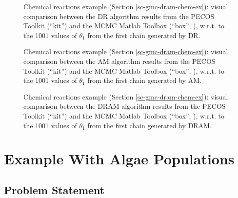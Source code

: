\begin{figure}[h!]
\begin{center}
\end{center}
\caption{Chemical reactions example (Section \ref{sc-gmc-dram-chem-ex}):
visual comparison between the DR algorithm results from the PECOS Toolkit (``kit'') and the MCMC Matlab Toolbox (``box'', \cite{mcmctool}), w.r.t. to the 1001 values of $\theta_1$ from the first chain generated by DR.
}
\label{fig-dram-chem-ex-comparison-DR-theta1-chain1}
\end{figure}

\begin{figure}[h!]
\begin{center}
\end{center}
\caption{Chemical reactions example (Section \ref{sc-gmc-dram-chem-ex}):
visual comparison between the AM algorithm results from the PECOS Toolkit (``kit'') and the MCMC Matlab Toolbox (``box'', \cite{mcmctool}), w.r.t. to the 1001 values of $\theta_1$ from the first chain generated by AM.
}
\label{fig-dram-chem-ex-comparison-AM-theta1-chain1}
\end{figure}

\begin{figure}[h!]
\begin{center}
\end{center}
\caption{Chemical reactions example (Section \ref{sc-gmc-dram-chem-ex}):
visual comparison between the DRAM algorithm results from the PECOS Toolkit (``kit'') and the MCMC Matlab Toolbox (``box'', \cite{mcmctool}), w.r.t. to the 1001 values of $\theta_1$ from the first chain generated by DRAM.
}
\label{fig-dram-chem-ex-comparison-DRAM-theta1-chain1}
\end{figure}

\clearpage

\section{Example With Algae Populations}\label{sc-gmc-dram-algae-ex}

\subsection{Problem Statement}
$~$\\

